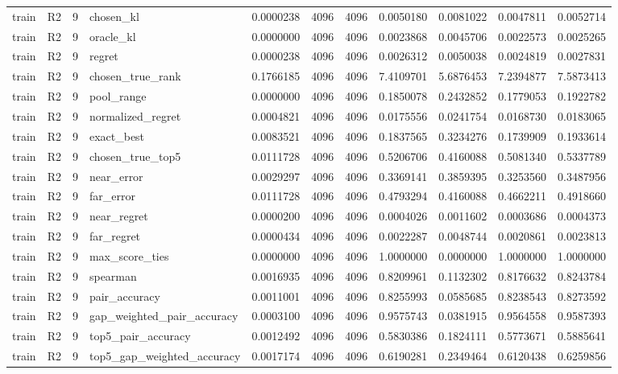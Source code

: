 \begin{tabular}{llrlrrrrrrr}
train & R2 & 9 & chosen_kl & 0.0000238 & 4096 & 4096 & 0.0050180 & 0.0081022 & 0.0047811 & 0.0052714 \\
train & R2 & 9 & oracle_kl & 0.0000000 & 4096 & 4096 & 0.0023868 & 0.0045706 & 0.0022573 & 0.0025265 \\
train & R2 & 9 & regret & 0.0000238 & 4096 & 4096 & 0.0026312 & 0.0050038 & 0.0024819 & 0.0027831 \\
train & R2 & 9 & chosen_true_rank & 0.1766185 & 4096 & 4096 & 7.4109701 & 5.6876453 & 7.2394877 & 7.5873413 \\
train & R2 & 9 & pool_range & 0.0000000 & 4096 & 4096 & 0.1850078 & 0.2432852 & 0.1779053 & 0.1922782 \\
train & R2 & 9 & normalized_regret & 0.0004821 & 4096 & 4096 & 0.0175556 & 0.0241754 & 0.0168730 & 0.0183065 \\
train & R2 & 9 & exact_best & 0.0083521 & 4096 & 4096 & 0.1837565 & 0.3234276 & 0.1739909 & 0.1933614 \\
train & R2 & 9 & chosen_true_top5 & 0.0111728 & 4096 & 4096 & 0.5206706 & 0.4160088 & 0.5081340 & 0.5337789 \\
train & R2 & 9 & near_error & 0.0029297 & 4096 & 4096 & 0.3369141 & 0.3859395 & 0.3253560 & 0.3487956 \\
train & R2 & 9 & far_error & 0.0111728 & 4096 & 4096 & 0.4793294 & 0.4160088 & 0.4662211 & 0.4918660 \\
train & R2 & 9 & near_regret & 0.0000200 & 4096 & 4096 & 0.0004026 & 0.0011602 & 0.0003686 & 0.0004373 \\
train & R2 & 9 & far_regret & 0.0000434 & 4096 & 4096 & 0.0022287 & 0.0048744 & 0.0020861 & 0.0023813 \\
train & R2 & 9 & max_score_ties & 0.0000000 & 4096 & 4096 & 1.0000000 & 0.0000000 & 1.0000000 & 1.0000000 \\
train & R2 & 9 & spearman & 0.0016935 & 4096 & 4096 & 0.8209961 & 0.1132302 & 0.8176632 & 0.8243784 \\
train & R2 & 9 & pair_accuracy & 0.0011001 & 4096 & 4096 & 0.8255993 & 0.0585685 & 0.8238543 & 0.8273592 \\
train & R2 & 9 & gap_weighted_pair_accuracy & 0.0003100 & 4096 & 4096 & 0.9575743 & 0.0381915 & 0.9564558 & 0.9587393 \\
train & R2 & 9 & top5_pair_accuracy & 0.0012492 & 4096 & 4096 & 0.5830386 & 0.1824111 & 0.5773671 & 0.5885641 \\
train & R2 & 9 & top5_gap_weighted_accuracy & 0.0017174 & 4096 & 4096 & 0.6190281 & 0.2349464 & 0.6120438 & 0.6259856 \\

\end{tabular}
